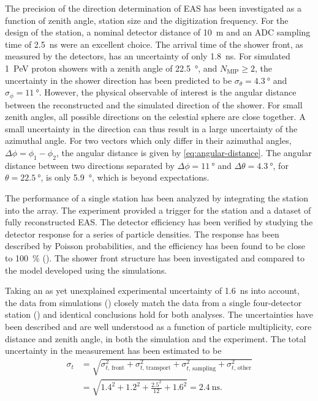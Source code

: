 The precision of the direction determination of EAS has been investigated as a
function of zenith angle, station size and the digitization frequency. For the
design of the station, a nominal detector distance of \SI{10}{\meter} and an ADC
sampling time of \SI{2.5}{\nano\second} were an excellent choice. The arrival
time of the shower front, as measured by the detectors, has an uncertainty of
only \SI{1.8}{\nano\second}. For simulated \SI{1}{\peta\electronvolt} proton
showers with a zenith angle of \SI{22.5}{\degree}, and $N_\mathrm{MIP} \geq 2$,
the uncertainty in the shower direction has been predicted to be $\sigma_\theta
= \SI{4.3}{\degree}$ and $\sigma_\phi = \SI{11}{\degree}$.
However, the physical observable of interest is the angular distance between the
reconstructed and the simulated direction of the shower.
For small zenith angles, all possible directions on the celestial sphere are
close together. A small uncertainty in the direction can thus result in a large
uncertainty of the azimuthal angle. For two vectors which only differ in their
azimuthal angles, $\Delta\phi = \phi_1 - \phi_2$, the angular distance is given
by \eqref{eq:angular-distance}. The angular distance between two directions
separated by $\Delta\phi = \SI{11}{\degree}$ and $\Delta\theta =
\SI{4.3}{\degree}$, for $\theta = \SI{22.5}{\degree}$, is only
\SI{5.9}{\degree}, which is beyond expectations.

The performance of a single station has been analyzed by integrating the station
into the \kascade array. The \kascade experiment provided a trigger for the
station and a dataset of fully reconstructed EAS.
The detector efficiency has been verified by studying the detector response for
a series of particle densities. The response has been described by Poisson
probabilities, and the efficiency has been found to be close to
\SI{100}{\percent} (). The shower front
structure has been investigated and compared to the model
developed using the simulations.

Taking an as yet unexplained experimental uncertainty of \SI{1.6}{\nano\second}
into account, the data from simulations () closely
match the data from a single four-detector \hisparc station ()
and identical conclusions hold for both analyses. The uncertainties have been
described and are well understood as a function of particle multiplicity, core
distance and zenith angle, in both the simulation and the experiment.
The total uncertainty in the measurement has been estimated to be
\begin{equation}
\begin{split}
\sigma_t &= \sqrt{\sigma_{t,\, \mathrm{front}}^2 + \sigma_{t,\,
\mathrm{transport}}^2 + \sigma_{t,\, \mathrm{sampling}}^2 + \sigma_{t,\,
\mathrm{other}}^2} \\[5pt]
&= \sqrt{1.4^2 + 1.2^2 + \frac{2.5^2}{12} + 1.6^2} = \SI{2.4}{\nano\second}.
\end{split}
\end{equation}

